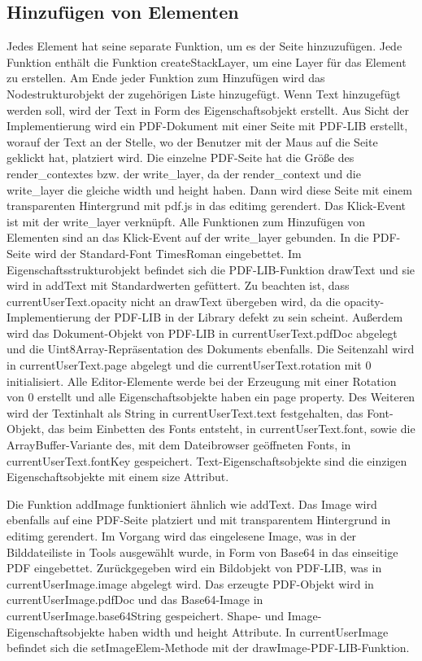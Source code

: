 \subsection{Hinzufügen von Elementen}
Jedes Element hat seine separate Funktion, um es der Seite hinzuzufügen. Jede Funktion enthält die Funktion createStackLayer, um eine Layer für das Element zu erstellen. Am Ende jeder Funktion zum Hinzufügen wird das Nodestrukturobjekt der zugehörigen Liste hinzugefügt. Wenn Text hinzugefügt werden soll, wird der Text in Form des Eigenschaftsobjekt erstellt. Aus Sicht der Implementierung wird ein PDF-Dokument mit einer Seite mit PDF-LIB erstellt, worauf der Text an der Stelle, wo der Benutzer mit der Maus auf die Seite geklickt hat, platziert wird. Die einzelne PDF-Seite hat die Größe des render\_contextes bzw. der write\_layer, da der render\_context und die write\_layer die gleiche width und height haben. Dann wird diese Seite mit einem transparenten Hintergrund mit pdf.js in das editimg gerendert. Das Klick-Event ist mit der write\_layer verknüpft. Alle Funktionen zum Hinzufügen von Elementen sind an das Klick-Event auf der write\_layer gebunden. In die PDF-Seite wird der Standard-Font TimesRoman eingebettet. Im Eigenschaftsstrukturobjekt befindet sich die PDF-LIB-Funktion drawText und sie wird in addText mit Standardwerten gefüttert. Zu beachten ist, dass currentUserText.opacity nicht an drawText übergeben wird, da die opacity-Implementierung der PDF-LIB in der Library defekt zu sein scheint. Außerdem wird das Dokument-Objekt von PDF-LIB in currentUserText.pdfDoc abgelegt und die Uint8Array-Repräsentation des Dokuments ebenfalls. Die Seitenzahl wird in currentUserText.page abgelegt und die currentUserText.rotation mit 0 initialisiert. Alle Editor-Elemente werde bei der Erzeugung mit einer Rotation von 0 erstellt und alle Eigenschaftsobjekte haben ein page property. Des Weiteren wird der Textinhalt als String in currentUserText.text festgehalten, das Font-Objekt, das beim Einbetten des Fonts entsteht, in currentUserText.font, sowie die ArrayBuffer-Variante des, mit dem Dateibrowser geöffneten Fonts, in currentUserText.fontKey gespeichert. Text-Eigenschaftsobjekte sind die einzigen Eigenschaftsobjekte mit einem size Attribut.
\par
Die Funktion addImage funktioniert ähnlich wie addText. Das Image wird ebenfalls auf eine PDF-Seite platziert und mit transparentem Hintergrund in editimg gerendert. Im Vorgang wird das eingelesene Image, was in der Bilddateiliste in Tools ausgewählt wurde, in Form von Base64 in das einseitige PDF eingebettet. Zurückgegeben wird ein Bildobjekt von PDF-LIB, was in currentUserImage.image abgelegt wird. Das erzeugte PDF-Objekt wird in currentUserImage.pdfDoc und das Base64-Image in currentUserImage.base64String gespeichert. Shape- und Image-Eigenschaftsobjekte haben width und height Attribute. In currentUserImage befindet sich die setImageElem-Methode mit der drawImage-PDF-LIB-Funktion.

